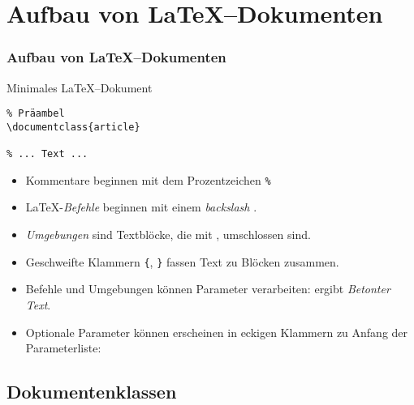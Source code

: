 \section{Aufbau von \LaTeX--Dokumenten}

\begin{frame}[c,fragile]
\frametitle{Aufbau von \LaTeX--Dokumenten}
\begin{block}{Minimales \LaTeX--Dokument}
\begin{verbatim}
% Präambel
\documentclass{article}

% ... Text ...

\end{verbatim}
\end{block}

\begin{itemize}
\item Kommentare beginnen mit dem Prozentzeichen \texttt{\%}
\item \LaTeX-\emph{Befehle} beginnen mit einem \emph{backslash} .
\item \emph{Umgebungen} sind Textbl\"ocke, die mit ,  umschlossen sind.
\item Geschweifte Klammern \texttt{\{}, \texttt{\}} fassen Text zu Bl\"ocken zusammen.
\item Befehle und Umgebungen k\"onnen Parameter verarbeiten:  ergibt \emph{Betonter Text}. 
\item Optionale Parameter k\"onnen erscheinen in eckigen Klammern zu Anfang der Parameterliste: \\
\end{itemize}
\end{frame}

\subsection{Dokumentenklassen}

